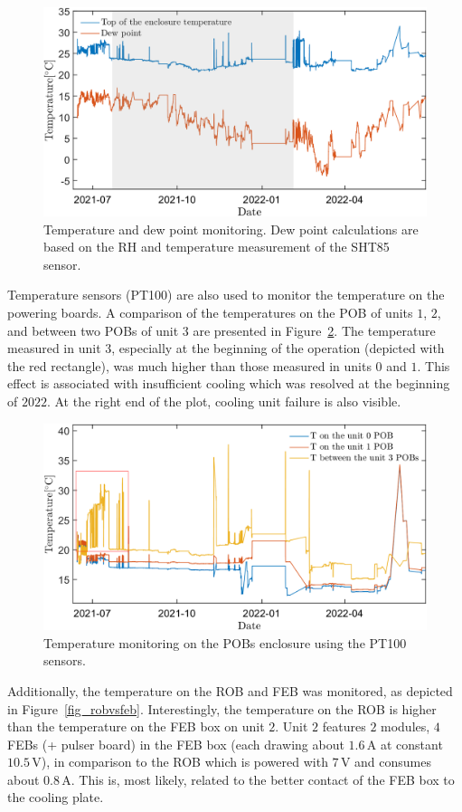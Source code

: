 \begin{figure}[!h]
\centering
\includegraphics[width=0.9\columnwidth]{Chapter6/DCS/images/dew.png}
\caption{Temperature and dew point monitoring. Dew point calculations are based on the \gls{RH} and temperature measurement of the SHT85 sensor.}
\label{fig_dew}
\end{figure}


Temperature sensors (PT100) are also used to monitor the temperature on the powering boards. A comparison of the temperatures on the \gls{POB} of units $1$, $2$, and between two \glspl{POB} of unit 3 are presented in Figure~\ref{fig_POB1}. The temperature measured in unit $3$, especially at the beginning of the operation (depicted with the red rectangle), was much higher than those measured in units $0$ and $1$. This effect is associated with insufficient cooling which was resolved at the beginning of $2022$. At the right end of the plot, cooling unit failure is also visible.
\begin{figure}[!h]
\centering
\includegraphics[width=0.9\columnwidth]{Chapter6/DCS/images/POB1.png}
\caption{Temperature monitoring on the \glspl{POB} enclosure using the PT100 sensors.}
\label{fig_POB1}
\end{figure}

Additionally, the temperature on the \gls{ROB} and \gls{FEB} was monitored, as depicted in Figure~\ref{fig_robvsfeb}. Interestingly, the temperature on the \gls{ROB} is higher than the temperature on the \gls{FEB} box on unit $2$. Unit $2$ features $2$ modules, $4 $\gls{FEB}s (+ pulser board) in the \gls{FEB} box (each drawing about $1.6$\,A at constant $10.5$\,V), in comparison to the \gls{ROB} which is powered with $7$\,V and consumes about $0.8$\,A. This is, most likely, related to the better contact of the \gls{FEB} box to the cooling plate.

